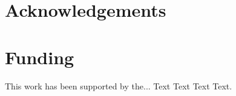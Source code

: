 \documentclass{bioinfo}
\begin{document}
\vspace*{-10pt}


\section*{Acknowledgements}

\vspace*{-12pt}

\section*{Funding}

This work has been supported by the... Text Text  Text Text.\vspace*{-12pt}

%
%
%
%
%
%
%
%

\end{document}
